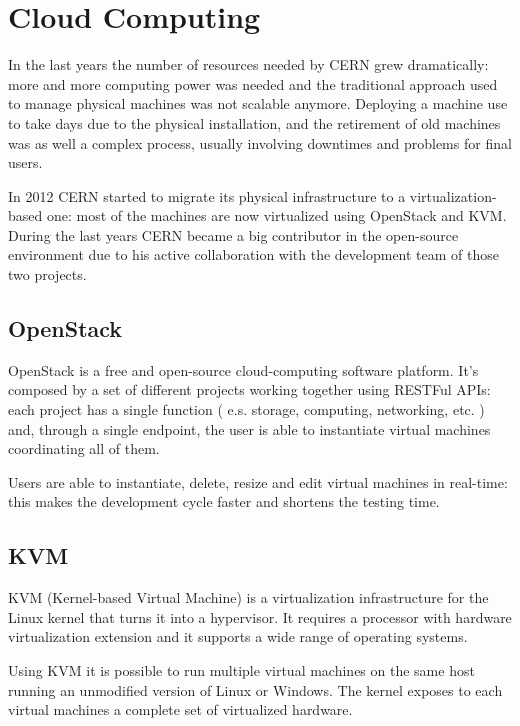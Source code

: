\section{Cloud Computing}

In the last years the number of resources needed by CERN grew
dramatically: more and more computing power was needed and the traditional
approach used to manage physical machines was not scalable anymore.
Deploying a machine use to take days due to the physical installation, and
the retirement of old machines was as well a complex process, usually
involving downtimes and problems for final users.

In 2012 CERN started to migrate its physical infrastructure to
a virtualization-based one: most of the machines are now virtualized using
OpenStack and KVM. During the last years CERN became a big contributor in
the open-source environment due to his active collaboration with the
development team of those two projects.

\subsection{OpenStack}

OpenStack is a free and open-source cloud-computing software platform.
It's composed by a set of different projects working together using
RESTFul APIs: each project has a single function ( e.s. storage,
computing, networking, etc. ) and, through a single endpoint, the user is
able to instantiate virtual machines coordinating all of them.

Users are able to instantiate, delete, resize and edit virtual machines in
real-time: this makes the development cycle faster and shortens the
testing time.


\subsection{KVM}

KVM (Kernel-based Virtual Machine) is a virtualization infrastructure for
the Linux kernel that turns it into a hypervisor. It requires a processor
with hardware virtualization extension and it supports a wide range of
operating systems.

Using KVM it is possible to run multiple virtual machines on the same host
running an unmodified version of Linux or Windows. The kernel exposes to
each virtual machines a complete set of virtualized hardware.
